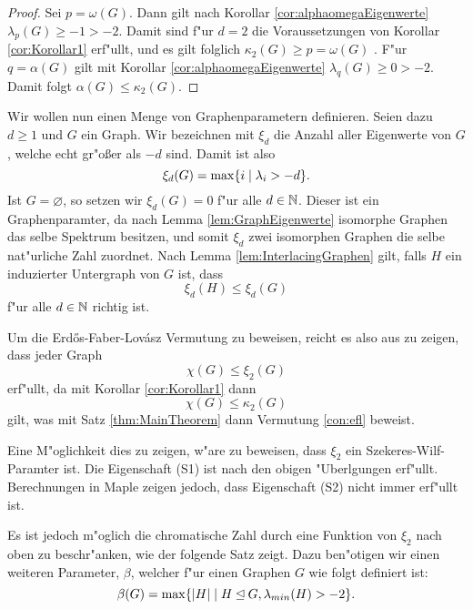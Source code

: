 \begin{proof}
  Sei $p = \omega(G)$. Dann gilt nach Korollar \ref{cor:alphaomegaEigenwerte} $\lambda_{p}\left( G \right)\geq -1 > -2$. Damit sind f"ur $d=2$ die Voraussetzungen von Korollar \ref{cor:Korollar1} erf"ullt, und es gilt folglich $\kappa_{2}\left( G \right)\geq p = \omega\left( G \right)$ .
  F"ur $q=\alpha\left( G \right)$ gilt mit Korollar \ref{cor:alphaomegaEigenwerte} $\lambda_{q}\left( G \right)\geq 0 > -2$. Damit folgt $\alpha\left( G \right) \leq \kappa_{2}\left( G \right)$.
\end{proof}

Wir wollen nun einen Menge von Graphenparametern definieren. Seien dazu $d\geq 1$ und $G$ ein Graph. Wir bezeichnen mit $\xi_{d}$ die Anzahl aller Eigenwerte von $G$, welche echt gr"o{\ss}er als $-d$ sind. Damit ist also 
$$\xi_{d}(G) = \max \{i \;|\; \lambda_i > -d \}.$$
Ist $G=\varnothing$, so setzen wir $\xi_{d}(G) = 0$ f"ur alle $d\in{\mathbb{N}}$.
Dieser ist ein Graphenparamter, da nach Lemma \ref{lem:GraphEigenwerte} isomorphe Graphen das selbe Spektrum besitzen, und somit $\xi_d $ zwei isomorphen Graphen die selbe nat"urliche Zahl zuordnet. 
Nach Lemma \ref{lem:InterlacingGraphen} gilt, falls $H$ ein induzierter Untergraph von $G$ ist, dass $$\xi_d(H) \leq \xi_{d}(G)$$ f"ur alle $d\in {\mathbb{N}}$ richtig ist. 

Um die Erd\H{o}s-Faber-Lov\'asz Vermutung zu beweisen, reicht es also aus zu zeigen, dass jeder Graph $$\chi(G) \leq \xi_{2}(G)$$ erf"ullt, da mit Korollar \ref{cor:Korollar1} dann $$\chi(G) \leq \kappa_{2}(G)$$ gilt, was mit Satz \ref{thm:MainTheorem} dann Vermutung \ref{con:efl} beweist.

Eine M"oglichkeit dies zu zeigen, w"are zu beweisen, dass $\xi_2$ ein Szekeres-Wilf-Paramter ist. Die Eigenschaft (S1) ist nach den obigen "Uberlgungen erf"ullt. Berechnungen in Maple zeigen jedoch, dass Eigenschaft (S2) nicht immer erf"ullt ist. 

Es ist jedoch m"oglich die chromatische Zahl durch eine Funktion von $\xi_2$ nach oben zu beschr"anken, wie der folgende Satz zeigt. Dazu ben"otigen wir einen weiteren Parameter, $\beta$, welcher f"ur einen Graphen $G$ wie folgt definiert ist:
$$\beta(G) = \max\{|H| \;|\; H\unlhd G, \lambda_{min}(H) > -2 \}.$$

